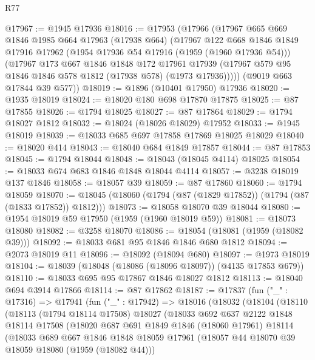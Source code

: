 \begin{lexlean}{R77}
\begin{coremodule}
@17967 := @1945 @17936
@18016 := @17953
    (@17966
      (@17967
        @665
        @669
        @1846
        @1985
        @664
        @17963
        (@17938 @664)
        (@17967
          @122
          @668
          @1846
          @1849
          @17916
          @17962
          (@1954 @17936 @54 @17916 (@1959 (@1960 @17936 @54)))
          (@17967
            @173
            @667
            @1846
            @1848
            @172
            @17961
            @17939
            (@17967 @579 @95 @1846 @1846 @578 @1812 (@17938 @578) (@1973 @17936)))))
      (@9019 @663 @17844 @39 @577))
@18019 := @1896 (@10401 @17950) @17936
@18020 := @1935 @18019
@18024 := @18020 @180 @698 @17870 @17875
@18025 := @87 @17855
@18026 := @1794 @18025
@18027 := @87 @17864
@18029 := @1794 @18027 @1812
@18032 := @18024 (@18026 @18029) @17952
@18033 := @1945 @18019
@18039 := @18033 @685 @697 @17858 @17869 @18025 @18029
@18040 := @18020 @414
@18043 := @18040 @684 @1849 @17857
@18044 := @87 @17853
@18045 := @1794 @18044
@18048 := @18043 (@18045 @4114) @18025
@18054 := @18033 @674 @683 @1846 @1848 @18044 @4114
@18057 := @3238 @18019 @137 @1846
@18058 := @18057 @39
@18059 := @87 @17860
@18060 := @1794 @18059
@18070 := @18045 (@18060 (@1794 (@87 (@1829 @17852)) (@1794 (@87 (@1833 @17852)) @1812)))
@18073 := @18058 @18070 @39 @18044
@18080 := @1954 @18019 @59 @17950 (@1959 (@1960 @18019 @59))
@18081 := @18073 @18080
@18082 := @3258 @18070
@18086 := @18054 (@18081 (@1959 (@18082 @39)))
@18092 := @18033 @681 @95 @1846 @1846 @680 @1812
@18094 := @2073 @18019 @11
@18096 := @18092 (@18094 @680)
@18097 := @1973 @18019
@18104 := @18039 (@18048 (@18086 (@18096 @18097)) (@4135 @17853 @679))
@18110 := @18033 @695 @95 @17867 @1846 @18027 @1812
@18113 := @18040 @694 @3914 @17866
@18114 := @87 @17862
@18187 := @17837
    (fun ("_" : @17316) =>
    @17941
      (fun ("_" : @17942) =>
      @18016
        (@18032
          (@18104
            (@18110
              (@18113
                (@1794 @18114 @17508)
                @18027
                (@18033
                  @692
                  @637
                  @2122
                  @1848
                  @18114
                  @17508
                  (@18020
                    @687
                    @691
                    @1849
                    @1846
                    (@18060 @17961)
                    @18114
                    (@18033
                      @689
                      @667
                      @1846
                      @1848
                      @18059
                      @17961
                      (@18057 @44 @18070 @39 @18059 @18080 (@1959 (@18082 @44)))

\end{coremodule}
\end{lexlean}

